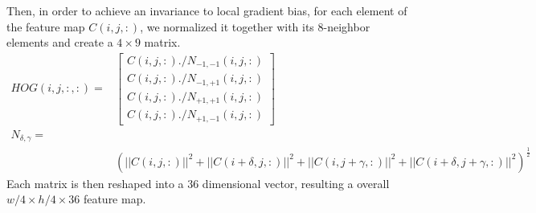 \documentclass[12pt]{article}
\begin{document}
Then, in order to achieve an invariance to local gradient bias, for each element of the feature map $C(i,j,:)$, we normalized it together with its 8-neighbor elements and create a $4\times 9$ matrix.
\begin{equation}
\begin{aligned}
HOG(i,j,:,:) =&  \left[\begin{array}{c}
C(i,j,:)./N_{-1,-1}(i,j,:)\\
C(i,j,:)./N_{-1,+1}(i,j,:)\\
C(i,j,:)./N_{+1,+1}(i,j,:)\\
C(i,j,:)./N_{+1,-1}(i,j,:)\end{array}\right]\\
 N_{\delta,\gamma} =&\\
 & (||C(i,j,:)||^2+||C(i+\delta,j,:)||^2+||C(i,j+\gamma,:)||^2+||C(i+\delta,j+\gamma,:)||^2)^{\frac{1}{2}}
\end{aligned}
\end{equation}\cite{felzenszwalb2010object}
Each matrix is then reshaped into a 36 dimensional vector, resulting a overall $ w/4 \times h/4 \times 36$ feature map.
\end{document}
